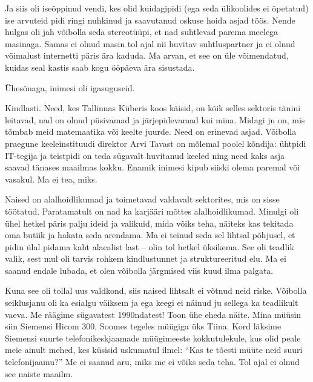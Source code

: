 Ja siis oli iseõppinud vendi, kes olid kuidagipidi (ega seda ülikoolides ei õpetatud) 
ise arvuteid pidi ringi nuhkinud ja saavutanud oskuse hoida asjad töös. 
Nende hulgas oli jah võibolla seda stereotüüpi, et nad
suhtlevad parema meelega masinaga. Samas ei olnud masin tol ajal nii huvitav 
suhtluspartner ja ei olnud võimalust internetti päris ära kaduda. Ma arvan, et see on üle võimendatud, 
kuidas seal kastis saab kogu ööpäeva ära sisustada. 

Ühesõnaga, inimesi oli igasuguseid.


Kindlasti. Need, kes Tallinnas 
Küberis koos käisid, on kõik selles sektoris tänini leitavad, nad on olnud
püsivamad ja järjepidevamad kui mina. Midagi ju on, mis tõmbab meid
matemaatika või keelte juurde. Need on erinevad 
asjad. Võibolla praegune 
keeleinstituudi direktor Arvi Tavast on mõlemal poolel 
kõndija: ühtpidi IT-tegija ja teistpidi on teda sügavalt huvitanud 
keeled ning need kaks asja saavad tänases maailmas kokku. Enamik inimesi 
kipub siiski olema paremal või vasakul. Ma ei tea, miks.

\label{sisu:tydrukud}

Naised on alalhoidlikumad ja toimetavad valdavalt sektorites, mis on 
sisse töötatud. Paratamatult on nad ka karjääri mõttes 
alalhoidlikumad. Minulgi oli ühel hetkel päris 
palju ideid ja valikuid, mida võiks teha, näiteks kas tekitada oma butiik ja 
hakata seda arendama. Ma ei teinud seda sel lihtsal põhjusel, et pidin ülal pidama kaht alaealist last -- olin tol hetkel üksikema. See oli teadlik valik, sest mul oli tarvis rohkem kindlustunnet ja struktureeritud elu. Ma 
ei saanud endale lubada, et olen võibolla järgmised viis kuud ilma palgata. 

Kuna see oli tollal uus valdkond, siis naised lihtsalt ei võtnud neid riske. Võibolla 
seiklusjanu oli ka esialgu väiksem ja ega keegi ei näinud ju 
sellega ka teadlikult vaeva. Me räägime sügavatest 1990ndatest! Toon ühe
eheda näite. Mina müüsin siin Siemensi Hicom 300, Soomes tegeles müügiga üks Tiina. Kord läksime 
Siemensi suurte telefonikeskjaamade müügimeeste kokkutulekule, kus olid peale meie ainult 
mehed, kes küsisid uskumatul ilmel: 
\enquote{Kas te tõesti müüte neid suuri telefonijaamu?} Me ei saanud aru, miks 
me ei võiks seda teha. Tol ajal ei olnud see naiste maailm. 

